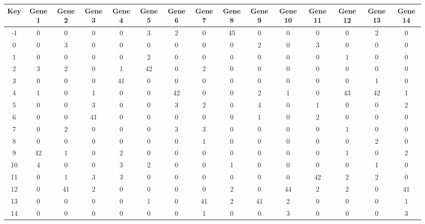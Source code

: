 \begin{tabular}{|c|c|c|c|c|c|c|c|c|c|c|c|c|c|c|}
\hline
Key & Gene 1 & Gene 2 & Gene 3 & Gene 4 & Gene 5 & Gene 6 & Gene 7 & Gene 8 & Gene 9 & Gene 10 & Gene 11 & Gene 12 & Gene 13 & Gene 14 \\
\hline
-1 & 0 & 0 & 0 & 0 & 3 & 2 & 0 & 45 & 0 & 0 & 0 & 0 & 2 & 0 \\
0 & 0 & 3 & 0 & 0 & 0 & 0 & 0 & 0 & 2 & 0 & 3 & 0 & 0 & 0 \\
1 & 0 & 0 & 0 & 0 & 2 & 0 & 0 & 0 & 0 & 0 & 0 & 1 & 0 & 0 \\
2 & 3 & 2 & 0 & 1 & 42 & 0 & 2 & 0 & 0 & 0 & 0 & 0 & 0 & 0 \\
3 & 0 & 0 & 0 & 41 & 0 & 0 & 0 & 0 & 0 & 0 & 0 & 0 & 1 & 0 \\
4 & 1 & 0 & 1 & 0 & 0 & 42 & 0 & 0 & 2 & 1 & 0 & 43 & 42 & 1 \\
5 & 0 & 0 & 3 & 0 & 0 & 3 & 2 & 0 & 4 & 0 & 1 & 0 & 0 & 2 \\
6 & 0 & 0 & 41 & 0 & 0 & 0 & 0 & 0 & 1 & 0 & 2 & 0 & 0 & 0 \\
7 & 0 & 2 & 0 & 0 & 0 & 3 & 3 & 0 & 0 & 0 & 0 & 1 & 0 & 0 \\
8 & 0 & 0 & 0 & 0 & 0 & 0 & 1 & 0 & 0 & 0 & 0 & 0 & 2 & 0 \\
9 & 42 & 1 & 0 & 2 & 0 & 0 & 0 & 0 & 0 & 0 & 0 & 1 & 0 & 2 \\
10 & 4 & 0 & 0 & 3 & 2 & 0 & 0 & 1 & 0 & 0 & 0 & 0 & 1 & 0 \\
11 & 0 & 1 & 3 & 3 & 0 & 0 & 0 & 0 & 0 & 0 & 42 & 2 & 2 & 0 \\
12 & 0 & 41 & 2 & 0 & 0 & 0 & 0 & 2 & 0 & 44 & 2 & 2 & 0 & 41 \\
13 & 0 & 0 & 0 & 0 & 1 & 0 & 41 & 2 & 41 & 2 & 0 & 0 & 0 & 1 \\
14 & 0 & 0 & 0 & 0 & 0 & 0 & 1 & 0 & 0 & 3 & 0 & 0 & 0 & 3 \\
\hline
\end{tabular}